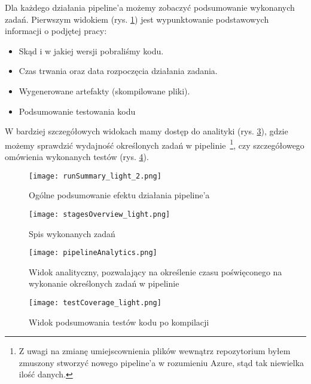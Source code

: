 Dla każdego działania pipeline'a możemy zobaczyć podsumowanie wykonanych zadań.
Pierwszym widokiem (rys. \ref{img:runSummary}) jest wypunktowanie podstawowych informacji o podjętej pracy:
\begin{itemize}
    \item Skąd i w jakiej wersji pobraliśmy kodu.
    \item Czas trwania oraz data rozpoczęcia działania zadania.
    \item Wygenerowane artefakty (skompilowane pliki).
    \item Podsumowanie testowania kodu
\end{itemize}

W bardziej szczegółowych widokach mamy dostęp do analityki (rys. \ref{img:pipelineAnalytics}), 
gdzie możemy sprawdzić wydajność określonych zadań w pipelinie~\footnote{%
    Z uwagi na zmianę umiejscownienia plików wewnątrz repozytorium byłem zmuszony stworzyć 
    nowego pipeline'a w rozumieniu Azure, stąd tak niewielka ilość danych.
}, czy szczegółowego omówienia wykonanych testów (rys. \ref{img:testCoverage}).
\clearpage

\begin{figure}[!ht]
    \centering
    \texttt{[image: runSummary\_light\_2.png]}
    \caption{Ogólne podsumowanie efektu działania pipeline'a}
    \label{img:runSummary}
\end{figure}

\begin{figure}[!ht]
    \centering
    \texttt{[image: stagesOverview\_light.png]}
    \caption{Spis wykonanych zadań}
    \label{img:stagesOverview}
\end{figure}

\begin{figure}[!ht]
    \centering
    \texttt{[image: pipelineAnalytics.png]}
    \caption{Widok analityczny, pozwalający na określenie czasu poświęconego na wykonanie
        określonych zadań w pipelinie}
    \label{img:pipelineAnalytics}
\end{figure}


\begin{figure}[!hb]
    \centering
    \texttt{[image: testCoverage\_light.png]}
    \caption{Widok podsumowania testów kodu po kompilacji}
    \label{img:testCoverage}
\end{figure}

\restoregeometry
